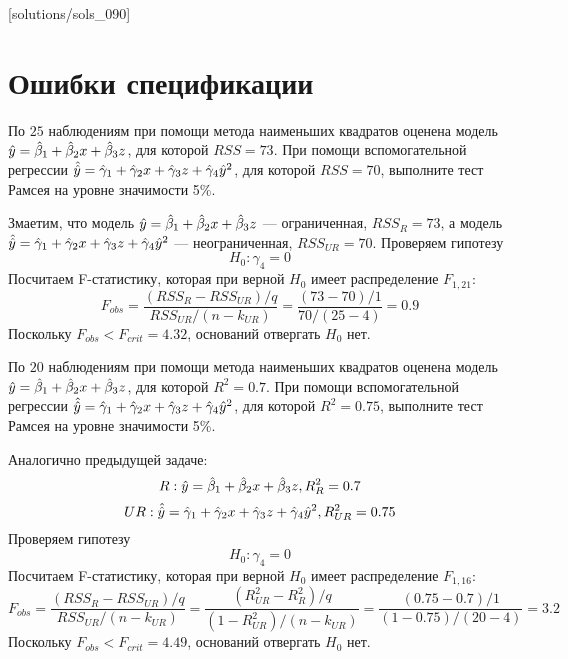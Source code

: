 [solutions/sols_090]

\chapter{Ошибки спецификации}


\begin{problem}
По $25$ наблюдениям при помощи метода наименьших квадратов оценена
модель $\hat{y}=\hat{\beta}_1+\hat{\beta}_2 x +\hat{\beta}_3 z$, для которой $RSS = 73$. При помощи вспомогательной регрессии $\hat{\hat{y}}=\hat{\gamma}_1+\hat{\gamma}_2 x +\hat{\gamma}_3 z+\hat{\gamma}_4 \hat{y}^2$, для которой $RSS = 70$, выполните тест Рамсея на уровне значимости 5\%.


\begin{sol}
Змаетим, что модель $\hat{y}=\hat{\beta}_1+\hat{\beta}_2 x +\hat{\beta}_3 z$ — ограниченная, $RSS_R = 73$, а модель  $\hat{\hat{y}}=\hat{\gamma}_1+\hat{\gamma}_2 x +\hat{\gamma}_3 z+\hat{\gamma}_4 \hat{y}^2$ — неограниченная, $RSS_{UR} = 70$.
Проверяем гипотезу
\[
H_0: \gamma_4 = 0
\]
Посчитаем F-статистику, которая при верной $H_0$ имеет распределение $F_{1, 21}$:
\[
F_{obs} = \frac{(RSS_{R} - RSS_{UR})/q}{RSS_{UR}/(n-k_{UR})} = \frac{(73-70)/1}{70/(25-4)} = 0.9
\]
Поскольку $F_{obs} < F_{crit} = 4.32$, оснований отвергать $H_0$ нет.
\end{sol}
\end{problem}



\begin{problem}
По $20$ наблюдениям при помощи метода наименьших квадратов оценена
модель $\hat{y}=\hat{\beta}_1+\hat{\beta}_2 x +\hat{\beta}_3 z$, для которой $R^2 = 0.7$. При помощи вспомогательной регрессии $\hat{\hat{y}}=\hat{\gamma}_1+\hat{\gamma}_2 x +\hat{\gamma}_3 z+\hat{\gamma}_4 \hat{y}^2$, для которой $R^2 = 0.75$, выполните тест Рамсея на уровне значимости 5\%.

\begin{sol}
Аналогично предыдущей задаче:
\[
R: \hat{y}=\hat{\beta}_1+\hat{\beta}_2 x +\hat{\beta}_3 z, R^2_R = 0.7
\]
\[
UR: \hat{\hat{y}}=\hat{\gamma}_1+\hat{\gamma}_2 x +\hat{\gamma}_3 z+\hat{\gamma}_4 \hat{y}^2, R^2_{UR} = 0.75
\]
Проверяем гипотезу
\[
H_0: \gamma_4 = 0
\]
Посчитаем F-статистику, которая при верной $H_0$ имеет распределение $F_{1, 16}$:
\[
F_{obs} = \frac{(RSS_{R} - RSS_{UR})/q}{RSS_{UR}/(n-k_{UR})} = \frac{(R^2_{UR} - R^2_{R})/q}{(1-R^2_{UR})/(n-k_{UR})} = \frac{(0.75-0.7)/1}{(1-0.75)/(20-4)} = 3.2
\]
Поскольку $F_{obs} < F_{crit} = 4.49$, оснований отвергать $H_0$ нет.
\end{sol}
\end{problem}




